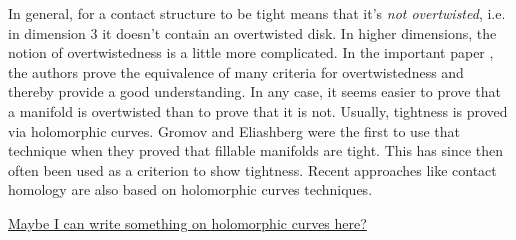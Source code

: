 In general, for a contact structure to be tight means that it's \textit{not overtwisted}, i.e. in dimension 3 it doesn't contain an overtwisted disk.
In higher dimensions, the notion of overtwistedness is a little more complicated. In the important paper \cite{CMP19}, the authors prove the equivalence 
of many criteria for overtwistedness and thereby provide a good understanding. In any case, it seems easier to prove that a manifold is overtwisted than
to prove that it is not.
Usually, tightness is proved via holomorphic curves. Gromov and Eliashberg were the first to use that technique \cite{Gromov85,Eliashberg91}
when they proved that fillable manifolds are tight. This has since then often been used as a criterion to show tightness.
Recent approaches like contact homology are also based on holomorphic curves techniques.

\underline{Maybe I can write something on holomorphic curves here?}